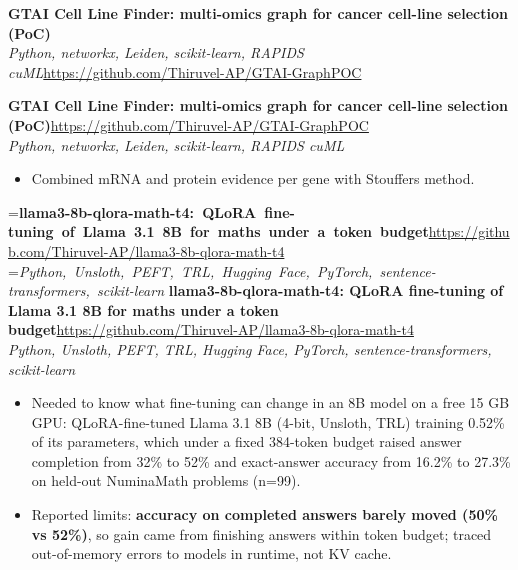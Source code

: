\documentclass[a4paper,11pt]{article}
\newcommand{\project}[3]{%
  \textbf{#1}\hfill#3\\ {\color{muted}\small\textit{#2}}\par}
\newcommand{\gap}{\vspace{5pt}}
\newcommand{\num}[1]{\textbf{#1}}   %
\begin{document}
\else
\textbf{GTAI Cell Line Finder: multi-omics graph for cancer cell-line selection (PoC)}\\ {\color{muted}\small\textit{Python, networkx, Leiden, scikit-learn, RAPIDS cuML}}\hfill{\small\url{https://github.com/Thiruvel-AP/GTAI-GraphPOC}}\par
\fi
\else
\project{GTAI Cell Line Finder: multi-omics graph for cancer cell-line selection (PoC)}{Python, networkx, Leiden, scikit-learn, RAPIDS cuML}{\url{https://github.com/Thiruvel-AP/GTAI-GraphPOC}}
\fi
\begin{itemize}
  \item Combined mRNA and protein evidence per gene with Stouffer\textquotesingle{}s method.
\end{itemize}
\gap
{}
=\hbox{\textbf{llama3-8b-qlora-math-t4: QLoRA fine-tuning of Llama 3.1 8B for maths under a token budget}\hspace{1em}\url{https://github.com/Thiruvel-AP/llama3-8b-qlora-math-t4}}%
=\hbox{{\small\textit{Python, Unsloth, PEFT, TRL, Hugging Face, PyTorch, sentence-transformers, scikit-learn}}}%
\ifdim\wd0>\linewidth
\ifdim\wd2>\linewidth
\textbf{llama3-8b-qlora-math-t4: QLoRA fine-tuning of Llama 3.1 8B for maths under a token budget}\\ {\color{muted}\small\textit{Python, Unsloth, PEFT, TRL, Hugging Face, PyTorch, sentence-transformers, scikit-learn}}\\ \hspace*{\fill}{\small\url{https://github.com/Thiruvel-AP/llama3-8b-qlora-math-t4}}\par
\else
\textbf{llama3-8b-qlora-math-t4: QLoRA fine-tuning of Llama 3.1 8B for maths under a token budget}\\ {\color{muted}\small\textit{Python, Unsloth, PEFT, TRL, Hugging Face, PyTorch, sentence-transformers, scikit-learn}}\hfill{\small\url{https://github.com/Thiruvel-AP/llama3-8b-qlora-math-t4}}\par
\fi
\else
\project{llama3-8b-qlora-math-t4: QLoRA fine-tuning of Llama 3.1 8B for maths under a token budget}{Python, Unsloth, PEFT, TRL, Hugging Face, PyTorch, sentence-transformers, scikit-learn}{\url{https://github.com/Thiruvel-AP/llama3-8b-qlora-math-t4}}
\fi
\begin{itemize}
  \item Needed to know what fine-tuning can change in an 8B model on a free 15 GB GPU: QLoRA-fine-tuned Llama 3.1 8B (4-bit, Unsloth, TRL) training 0.52\% of its parameters, which under a fixed 384-token budget raised answer completion from 32\% to 52\% and exact-answer accuracy from 16.2\% to 27.3\% on held-out NuminaMath problems (n=99).
  \item Reported limits: \num{accuracy on completed answers barely moved (50\% vs 52\%)}, so gain came from finishing answers within token budget; traced out-of-memory errors to models in runtime, not KV cache.
\end{itemize}
\end{document}
